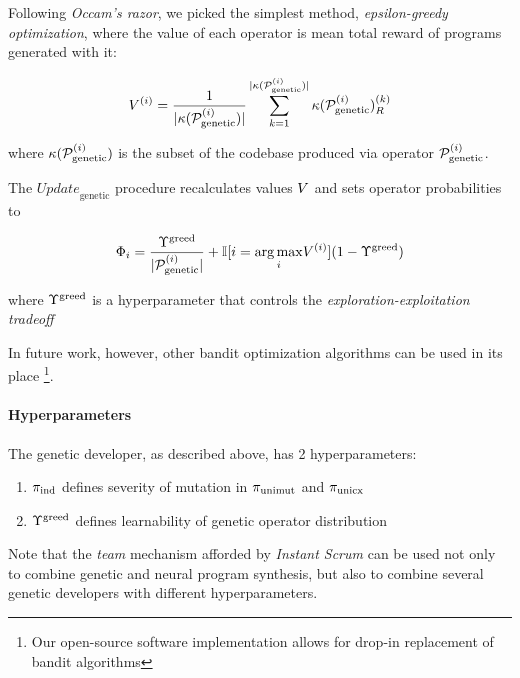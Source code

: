 Following \emph{Occam's razor}, we picked the simplest method, \emph{epsilon-greedy optimization}, where the value of each operator is mean total reward of programs generated with it:

\begin{equation}
    V^{(i)} = \frac{1}{|\kappa(\mathcal{P}_\text{genetic}^{(i)})|} 
    \sum\limits_{k=1}^{|\kappa(\mathcal{P}_\text{genetic}^{(i)})|}
    \kappa(\mathcal{P}_\text{genetic}^{(i)})_R^{(k)} 
\end{equation}

where $\kappa(\mathcal{P}_\text{genetic}^{(i)})$ is the subset of the codebase produced via operator $\mathcal{P}_\text{genetic}^{(i)}$.

The $\mathit{Update}_\text{genetic}$ procedure recalculates values $V$ and sets operator probabilities to

\begin{equation}
    \Phi_i = \frac{\Upsilon^\text{greed}}{|\mathcal{P}_\text{genetic}^{(i)}|} +
    \mathbb{I} [i = \underset{i}{\arg\max} V^{(i)}] (1 - \Upsilon^\text{greed})
\end{equation}

where $\Upsilon^\text{greed}$ is a hyperparameter that controls the \emph{exploration-exploitation tradeoff} \cite{banditsexplo}

In future work, however, other bandit optimization algorithms can be used in its place \footnote{Our open-source software implementation allows for drop-in replacement of bandit algorithms}.

\paragraph{Hyperparameters}

The genetic developer, as described above, has 2 hyperparameters:

\begin{enumerate}
    \item $\pi_\text{ind}$ defines severity of mutation in $\pi_\text{unimut}$ and $\pi_\text{unicx}$
    \item $\Upsilon^\text{greed}$ defines learnability of genetic operator distribution
\end{enumerate}

Note that the \emph{team} mechanism afforded by \emph{Instant Scrum} can be used not only to combine genetic and neural program synthesis, but also to combine several genetic developers with different hyperparameters.

